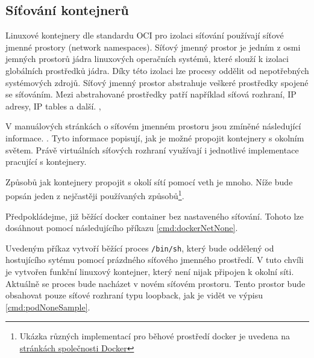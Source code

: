 \subsection{Síťování kontejnerů}\label{sitovaniKon}
Linuxové kontejnery dle standardu OCI pro izolaci síťování používají síťové jmenné prostory (network namespaces).
Síťový jmenný prostor je jedním z osmi jemných prostorů jádra linuxových operačních systémů, které slouží k izolaci globálních prostředků jádra. Díky této izolaci lze procesy oddělit od nepotřebných systémových zdrojů. Síťový jmenný prostor abstrahuje veškeré prostředky spojené se síťováním. Mezi abstrahované prostředky patří například síťová rozhraní, IP adresy, IP tables a další. \cite{thelinuxmanpagesproject_2022_namespaces7}, \cite{thelinuxmanpagesproject_2022_network_namespaces7}

V manuálových stránkách o síťovém jmenném prostoru jsou zmíněné následující informace.  . \cite{thelinuxmanpagesproject_2022_network_namespaces7} Tyto informace popisují, jak je možné propojit kontejnery s okolním světem. Právě virtuálních síťových rozhraní využívají i jednotlivé implementace pracující s kontejnery.    

Způsobů jak kontejnery propojit s okolí sítí pomocí veth je mnoho. Níže bude popsán jeden z nejčastěji používaných způsobů\footnote{Ukázka různých implementací pro běhové prostředí docker je uvedena na \href{https://docs.docker.com/network/}{stránkách společnosti Docker}}.

Předpokládejme, již běžící docker container bez nastaveného síťování. Tohoto lze dosáhnout pomocí následujícího příkazu \ref{cmd:dockerNetNone}.


Uvedeným příkaz vytvoří běžící proces \verb|/bin/sh|, který bude oddělený od hostujícího sytému pomocí prázdného síťového jmenného prostředí. V tuto chvíli je vytvořen funkční linuxový kontejner, který není nijak připojen k okolní síti. Aktuálně se proces bude nacházet v novém síťovém prostoru. Tento prostor bude obsahovat pouze síťové rozhraní typu loopback, jak je vidět ve výpisu \ref{cmd:podNoneSample}. 



